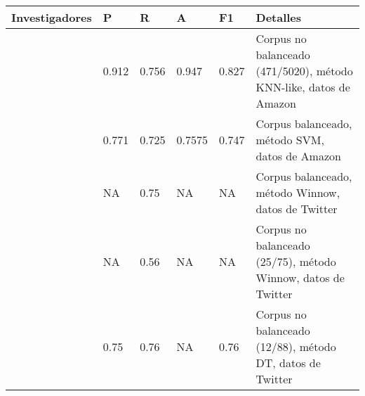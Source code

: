 		
		\begin{table}[!ht]
\begin{tabular}{|l|l|l|l|l|p{4cm}|}
\hline
Investigadores   & P & R & A & F1 & Detalles                                                                                                                                                                                                                          \\ \hline
\cite{davidov2010semi}      & 0.912     & 0.756  & 0.947     & 0.827   & Corpus no balanceado (471/5020), método  KNN-like, datos de Amazon \\ \hline
\cite{reyes2012making}     & 0.771     & 0.725  & 0.7575    & 0.747   & Corpus balanceado, método SVM, datos de  Amazon                                                                                                                                                                                           \\ \hline
\cite{liebrecht2013perfect}      & NA        & 0.75   & NA        & NA      & Corpus balanceado, método Winnow, datos de Twitter                                                                                                                                                                                   \\ \hline
\cite{liebrecht2013perfect}      & NA        & 0.56   & NA        & NA      & Corpus no balanceado (25/75), método Winnow, datos de Twitter                                                                                                                                                                                   \\ \hline
\cite{barbieri2014italian} & 0.75      & 0.76   & NA        & 0.76    & Corpus no balanceado (12/88), método \gls{DT}, datos de  Twitter                                                                                                                                                                                             \\ \hline


\end{tabular}
\end{table}

